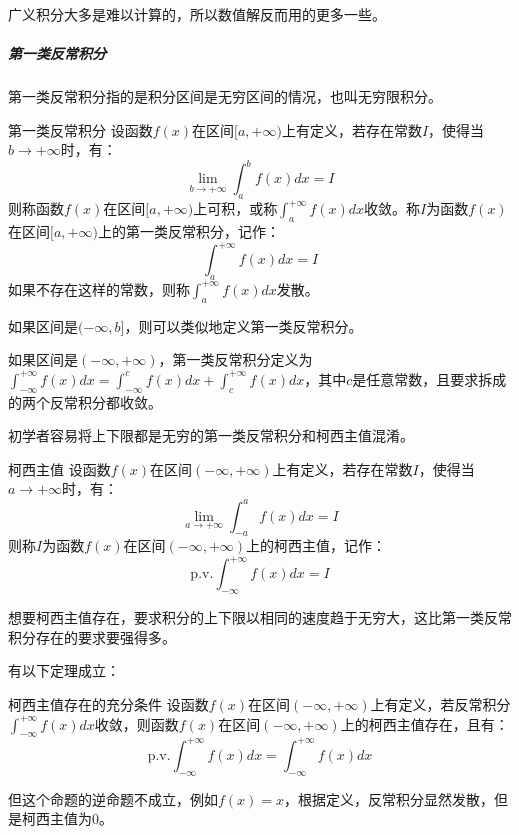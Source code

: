 广义积分大多是难以计算的，所以数值解反而用的更多一些。

\subparagraph{第一类反常积分}
第一类反常积分指的是积分区间是无穷区间的情况，也叫无穷限积分。
\begin{definition}{第一类反常积分}{}
    设函数$f(x)$在区间$[a, +\infty)$上有定义，若存在常数$I$，使得当$b \to +\infty$时，有：
    \begin{equation}
        \lim_{b \to +\infty} \int_a^b f(x) dx = I
    \end{equation}
    则称函数$f(x)$在区间$[a, +\infty)$上可积，或称$\int_a^{+\infty} f(x) dx$收敛。称$I$为函数$f(x)$在区间$[a, +\infty)$上的第一类反常积分，记作：
    \begin{equation}
        \int_a^{+\infty} f(x) dx = I
    \end{equation}
    如果不存在这样的常数，则称$\int_a^{+\infty} f(x) dx$发散。
\end{definition}

如果区间是$(-\infty, b]$，则可以类似地定义第一类反常积分。

如果区间是$(-\infty, +\infty)$，第一类反常积分定义为$\int_{-\infty}^{+\infty} f(x) dx = \int_{-\infty}^{c} f(x) dx + \int_{c}^{+\infty} f(x) dx$，其中$c$是任意常数，且要求拆成的两个反常积分都收敛。

初学者容易将上下限都是无穷的第一类反常积分和柯西主值混淆。
\begin{definition}{柯西主值}{}
    设函数$f(x)$在区间$(-\infty, +\infty)$上有定义，若存在常数$I$，使得当$a \to +\infty$时，有：
    \begin{equation}
        \lim_{a \to +\infty} \int_{-a}^{a} f(x) dx = I
    \end{equation}
    则称$I$为函数$f(x)$在区间$(-\infty, +\infty)$上的柯西主值，记作：
    \begin{equation}
        \text{p.v.} \int_{-\infty}^{+\infty} f(x) dx = I
    \end{equation}
\end{definition}
想要柯西主值存在，要求积分的上下限以相同的速度趋于无穷大，这比第一类反常积分存在的要求要强得多。

有以下定理成立：
\begin{theorem}{柯西主值存在的充分条件}{}
    设函数$f(x)$在区间$(-\infty, +\infty)$上有定义，若反常积分$\int_{-\infty}^{+\infty} f(x) dx$收敛，则函数$f(x)$在区间$(-\infty, +\infty)$上的柯西主值存在，且有：
    \begin{equation}
        \text{p.v.} \int_{-\infty}^{+\infty} f(x) dx = \int_{-\infty}^{+\infty} f(x) dx
    \end{equation}
\end{theorem}
但这个命题的逆命题不成立，例如$f(x) = x$，根据定义，反常积分显然发散，但是柯西主值为0。

